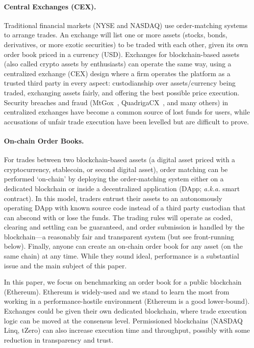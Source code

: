 \paragraph{Central Exchanges (CEX).} Traditional financial markets (\eg NYSE and NASDAQ) use order-matching systems to arrange trades. An exchange will list one or more assets (stocks, bonds, derivatives, or more exotic securities) to be traded with each other, given its own order book priced in a currency (\eg USD). Exchanges for blockchain-based assets (also called crypto assets by enthusiasts) can operate the same way, using a centralized exchange (CEX) design where a firm operates the platform as a trusted third party in every aspect: custodianship over assets/currency being traded, exchanging assets fairly, and offering the best possible price execution. Security breaches and fraud (\eg MtGox~\cite{TheHisto45:online}, QuadrigaCX~\cite{SEBIOrde83:online}, and many others) in centralized exchanges have become a common source of lost funds for users, while accusations of unfair trade execution have been levelled but are difficult to prove. 

\paragraph{On-chain Order Books.} For trades between two blockchain-based assets (\eg a digital asset priced with a cryptocurrency, stablecoin, or second digital asset), order matching can be performed `on-chain' by deploying the order-matching system either on a dedicated blockchain or inside a decentralized application (DApp; \textit{a.k.a.} smart contract). In this model, traders entrust their assets to an autonomously operating DApp with known source code instead of a third party custodian that can abscond with or lose the funds. The trading rules will operate as coded, clearing and settling can be guaranteed, and order submission is handled by the blockchain---a reasonably fair and transparent system (but see front-running below). Finally, anyone can create an on-chain order book for any asset (on the same chain) at any time. While they sound ideal, performance is a substantial issue and the main subject of this paper. 

In this paper, we focus on benchmarking an order book for a public blockchain (\eg Ethereum). Ethereum is widely-used and we stand to learn the most from working in a performance-hostile environment (\ie Ethereum is a good lower-bound). Exchanges could be given their own dedicated blockchain, where trade execution logic can be moved at the consensus level. Permissioned blockchains (\eg NASDAQ Linq, tZero) can also increase execution time and throughput, possibly with some reduction in transparency and trust.

